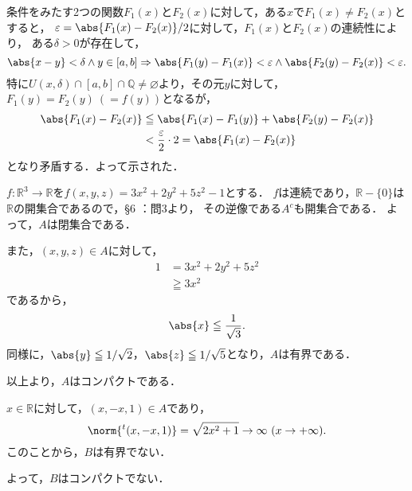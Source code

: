 \begin{tproof}
    条件をみたす2つの関数$F_1 (x)$と$F_2(x)$に対して，ある$x$で$F_1(x) \ne F_2(x)$とすると，
    $\varepsilon = \abs{F_1(x) - F_2(x)}/2$に対して，$F_1(x)$と$F_2(x)$の連続性により，
    ある$\delta >0$が存在して，
    \[
        \abs{x-y}<\delta \land y \in [a,b] \Rightarrow \abs{F_1(y)-F_1(x)}<\varepsilon \land  \abs{F_2(y)-F_2(x)}<\varepsilon.
    \]
    特に$ U (x,\delta) \cap [a,b] \cap \mathbb{Q} \ne \varnothing$より，その元$y$に対して，
    $F_1 (y)=F_2(y)~(=f(y))$となるが，
    \begin{align*}
        \abs{F_1(x)-F_2(x)} & \leqq \abs{F_1(x)-F_1(y)} + \abs{F_2(y)-F_2(x)}          \\
                            & < \frac{\varepsilon}{2} \cdot 2  = \abs{F_1(x) - F_2(x)}
    \end{align*}
    となり矛盾する．よって示された．
\end{tproof}







\begin{tanswer}
    $ f\colon \mathbb{R}^3 \to \mathbb{R}$を$f(x,y,z)=3x^2 + 2y^2 + 5z^2 -1$とする．
    $f$は連続であり，$\mathbb{R} -\{ 0 \}$は$\mathbb{R}$の開集合であるので，\S 6 ：問3より，
    その逆像である$A^c$も開集合である．
    よって，$A$は閉集合である．

    また，$(x,y,z) \in A$に対して，
    \begin{align*}
        1 & = 3x^2 + 2y^2 + 5z^2 \\
          & \geqq 3x^2
    \end{align*}
    であるから，
    \[
        \abs{x} \leqq \frac{1}{\sqrt{3}}.
    \]
    同様に，$ \abs{y} \leqq 1/\sqrt{2}$，$\abs{z} \leqq 1/\sqrt{5}$となり，$A$は有界である．

    以上より，$A$はコンパクトである．
\end{tanswer}



\begin{tanswer}
    $ x \in \mathbb{R}$に対して，$ (x,-x,1) \in A$であり，
    \[
        \norm{{}^t (x,-x,1)}=\sqrt{2x^2+1} \to \infty ~(x \to +\infty).
    \]
    このことから，$B$は有界でない．

    よって，$B$はコンパクトでない．
\end{tanswer}


